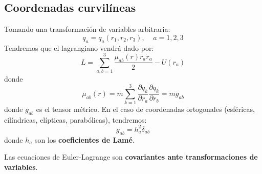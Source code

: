 \documentclass[]{report}
\numberwithin{equation}{section}
\newcommand{\0}{\textcolor{gray}{0}}
\begin{document}
\subsection{Coordenadas curvilíneas}
Tomando una transformación de variables arbitraria:
\begin{equation*}
	q_a = q_a(r_1, r_2, r_3),\ \ \ \ \ a=1,2,3
\end{equation*}
Tendremos que el lagrangiano vendrá dado por:
\begin{equation}
	L = \sum_{a,b=1}^{3} \frac{\mu_{ab}(r)\dot{r}_a \dot{r}_a}{2} - U(r_a)
\end{equation}
donde
\begin{equation}
	\mu_{ab}(r) = m \sum_{k=1}^{3}\dfrac{\partial q_k}{\partial r_a}\dfrac{\partial q_k}{\partial r_b} = m g_{ab}
\end{equation}
donde \(g_{ab}\) es el tensor métrico. En el caso de coordenadas ortogonales (esféricas, cilíndricas, elípticas, parabólicas), tendremos:
\begin{equation}
	g_{ab} = h_a^2\delta_{ab}
\end{equation}
donde \(h_a\) son los \textbf{coeficientes de Lamé}.

Las ecuaciones de Euler-Lagrange son \textbf{covariantes ante transformaciones de variables}.
\end{document}
